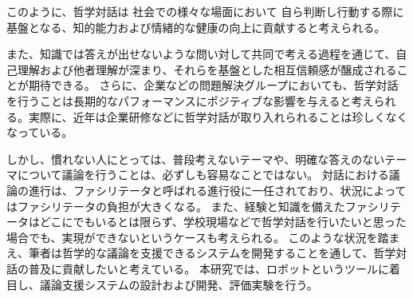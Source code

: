 \documentclass[11pt, a4paper]{jreport} %
\begin{document}







このように、哲学対話は
社会での様々な場面において
自ら判断し行動する際に基盤となる、知的能力および情緒的な健康の向上に貢献すると考えられる。


また、知識では答えが出せないような問い対して共同で考える過程を通じて、自己理解および他者理解が深まり、それらを基盤とした相互信頼感が醸成されることが期待できる。
さらに、企業などの問題解決グループにおいても、哲学対話を行うことは長期的なパフォーマンスにポジティブな影響を与えると考えられる。実際に、近年は企業研修などに哲学対話が取り入れられることは珍しくなくなっている\cite{kigyo}。







しかし、慣れない人にとっては、普段考えないテーマや、明確な答えのないテーマについて議論を行うことは、必ずしも容易なことではない。
対話における議論の進行は、ファシリテータと呼ばれる進行役に一任されており、状況によってはファシリテータの負担が大きくなる。
また、経験と知識を備えたファシリテータはどこにでもいるとは限らず、学校現場などで哲学対話を行いたいと思った場合でも、実現ができないというケースも考えられる。
このような状況を踏まえ、筆者は哲学的な議論を支援できるシステムを開発することを通して、哲学対話の普及に貢献したいと考えている。
本研究では、ロボットというツールに着目し、議論支援システムの設計および開発、評価実験を行う。

\end{document}
